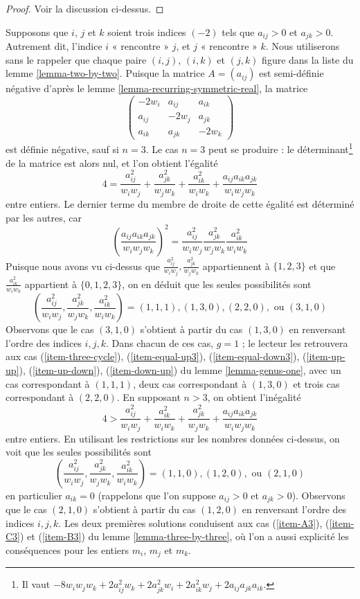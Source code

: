 \begin{proof}
Voir la discussion ci-dessus.
\end{proof}

\noindent
Supposons que $i$, $j$ et $k$ soient trois indices $(-2)$ tels que $a_{ij} > 0$
et $a_{jk} > 0$. Autrement dit, l'indice $i$ « rencontre » $j$, et
$j$ « rencontre » $k$. Nous utiliserons sans le rappeler que chaque paire
$(i, j)$, $(i, k)$ et $(j, k)$ figure dans la liste du lemme \ref{lemma-two-by-two}.
Puisque la matrice $A = (a_{ij})$ est semi-définie
négative d'après le lemme \ref{lemma-recurring-symmetric-real}, la matrice
$$
\left(
\begin{matrix}
-2w_i & a_{ij} & a_{ik} \\
a_{ij} & -2w_j & a_{jk} \\
a_{ik} & a_{jk} & -2w_k
\end{matrix}
\right)
$$
est définie négative, sauf si $n = 3$. Le cas $n = 3$ peut se produire :
le déterminant\footnote{Il vaut
$-8w_iw_jw_k + 2a_{ij}^2w_k + 2a_{jk}^2w_i + 2a_{ik}^2w_j +
2a_{ij}a_{jk}a_{ik}$.} de la matrice est alors nul,
et l'on obtient l'égalité
$$
4 = \frac{a_{ij}^2}{w_iw_j} +
\frac{a_{jk}^2}{w_jw_k} +
\frac{a_{ik}^2}{w_iw_k} +
\frac{a_{ij}a_{ik}a_{jk}}{w_iw_jw_k}
$$
entre entiers. Le dernier terme du membre de droite de cette égalité est déterminé
par les autres, car
$$
\left(\frac{a_{ij}a_{ik}a_{jk}}{w_iw_jw_k}\right)^2 =
\frac{a_{ij}^2}{w_iw_j} \frac{a_{jk}^2}{w_jw_k} \frac{a_{ik}^2}{w_iw_k}
$$
Puisque nous avons vu ci-dessus que
$\frac{a_{ij}^2}{w_iw_j}, \frac{a_{jk}^2}{w_jw_k}$ appartiennent à
$\{1, 2, 3\}$ et que $\frac{a_{ik}^2}{w_iw_k}$ appartient à $\{0, 1, 2, 3\}$,
on en déduit que les seules possibilités sont
$$
(\frac{a_{ij}^2}{w_iw_j}, \frac{a_{jk}^2}{w_jw_k}, \frac{a_{ik}^2}{w_iw_k}) =
(1, 1, 1), (1, 3, 0), (2, 2, 0),\text{ ou } (3, 1, 0)
$$
Observons que le cas $(3, 1, 0)$ s'obtient à partir du cas $(1, 3, 0)$
en renversant l'ordre des indices $i, j, k$.
Dans chacun de ces cas, $g = 1$ ; le lecteur les retrouvera aux cas
(\ref{item-three-cycle}), (\ref{item-equal-up3}), (\ref{item-equal-down3}),
(\ref{item-up-up}), (\ref{item-up-down}), (\ref{item-down-up}) du
lemme \ref{lemma-genus-one},
avec un cas correspondant à $(1, 1, 1)$,
deux cas correspondant à $(1, 3, 0)$ et
trois cas correspondant à $(2, 2, 0)$.
En supposant $n > 3$,
on obtient l'inégalité
$$
4 > \frac{a_{ij}^2}{w_iw_j} + \frac{a_{ik}^2}{w_iw_k} +
\frac{a_{jk}^2}{w_jw_k} + \frac{a_{ij}a_{ik}a_{jk}}{w_iw_jw_k}
$$
entre entiers. En utilisant les restrictions sur les nombres données ci-dessus,
on voit que les seules possibilités sont
$$
(\frac{a_{ij}^2}{w_iw_j}, \frac{a_{jk}^2}{w_jw_k}, \frac{a_{ik}^2}{w_iw_k}) =
(1, 1, 0), (1, 2, 0),\text{ ou }(2, 1, 0)
$$
en particulier $a_{ik} = 0$ (rappelons que l'on suppose
$a_{ij} > 0$ et $a_{jk} > 0$). Observons que le cas
$(2, 1, 0)$ s'obtient à partir du cas $(1, 2, 0)$ en renversant
l'ordre des indices $i, j, k$. Les deux premières solutions conduisent
aux cas (\ref{item-A3}), (\ref{item-C3}) et (\ref{item-B3})
du lemme \ref{lemma-three-by-three}, où l'on a aussi explicité les conséquences
pour les entiers $m_i$, $m_j$ et $m_k$.

